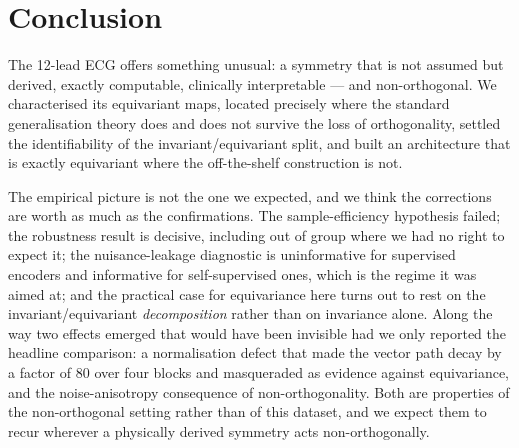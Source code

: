 \documentclass[11pt]{article}
\theoremstyle{definition}
\begin{document}
\section{Conclusion}

The 12-lead ECG offers something unusual: a symmetry that is not assumed but derived,
exactly computable, clinically interpretable --- and non-orthogonal. We characterised
its equivariant maps, located precisely where the standard generalisation theory does
and does not survive the loss of orthogonality, settled the identifiability of the
invariant/equivariant split, and built an architecture that is exactly equivariant
where the off-the-shelf construction is not.

The empirical picture is not the one we expected, and we think the corrections are
worth as much as the confirmations. The sample-efficiency hypothesis failed; the
robustness result is decisive, including out of group where we had no right to expect
it; the nuisance-leakage diagnostic is uninformative for supervised encoders and
informative for self-supervised ones, which is the regime it was aimed at; and the
practical case for equivariance here turns out to rest on the
invariant/equivariant \emph{decomposition} rather than on invariance alone. Along the
way two effects emerged that would have been invisible had we only reported the
headline comparison: a normalisation defect that made the vector path decay by a factor
of $80$ over four blocks and masqueraded as evidence against equivariance, and the
noise-anisotropy consequence of non-orthogonality. Both are properties of the
non-orthogonal setting rather than of this dataset, and we expect them to recur wherever
a physically derived symmetry acts non-orthogonally.



\end{document}
